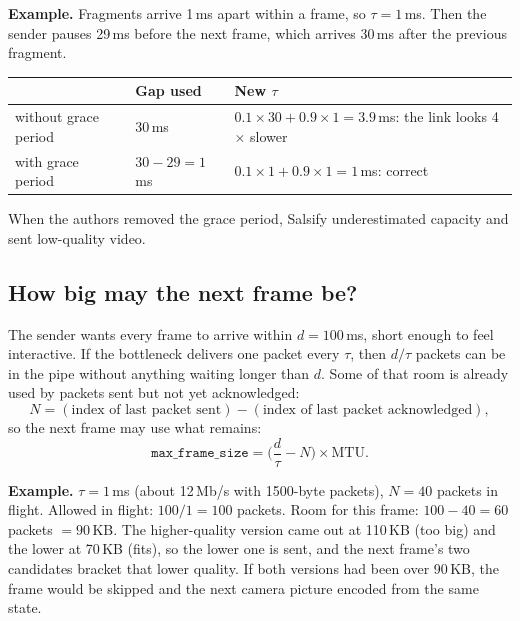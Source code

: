 \textbf{Example.} Fragments arrive 1\,ms apart within a frame, so $\tau = 1$\,ms. Then the sender pauses 29\,ms before the next frame, which arrives 30\,ms
after the previous fragment.
\begin{center}
\begin{tabular}{@{}lll@{}}
\toprule
 & Gap used & New $\tau$\\
\midrule
without grace period & 30\,ms & $0.1 \times 30 + 0.9 \times 1 = 3.9$\,ms: the link looks 4$\times$ slower\\
with grace period & $30 - 29 = 1$\,ms & $0.1 \times 1 + 0.9 \times 1 = 1$\,ms: correct\\
\bottomrule
\end{tabular}
\end{center}
When the authors removed the grace period, Salsify underestimated capacity and sent low-quality video.

\subsection{How big may the next frame be?}
The sender wants every frame to arrive within $d = 100$\,ms, short enough to feel interactive. If the bottleneck delivers one packet every $\tau$, then
$d / \tau$ packets can be in the pipe without anything waiting longer than $d$. Some of that room is already used by packets sent but not yet
acknowledged:
\[
  N = (\text{index of last packet sent}) - (\text{index of last packet acknowledged}),
\]
so the next frame may use what remains:
\[
  \texttt{max\_frame\_size} = \Big(\frac{d}{\tau} - N\Big) \times \text{MTU}.
\]

\textbf{Example.} $\tau = 1$\,ms (about 12\,Mb/s with 1500-byte packets), $N = 40$ packets in flight. Allowed in flight: $100 / 1 = 100$ packets. Room
for this frame: $100 - 40 = 60$ packets $= 90$\,KB. The higher-quality version came out at 110\,KB (too big) and the lower at 70\,KB (fits), so the
lower one is sent, and the next frame's two candidates bracket that lower quality. If both versions had been over 90\,KB, the frame would be skipped and
the next camera picture encoded from the same state.

